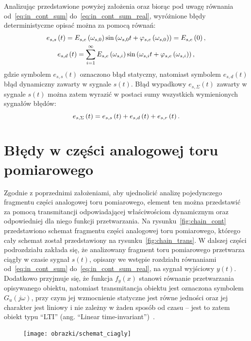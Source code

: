 Analizując przedstawione powyżej założenia oraz biorąc pod uwagę równania od~\eqref{eq:in_cont_sum} do~\eqref{eq:in_cont_sum_real}, wyróżnione błędy deterministyczne opisać można za pomocą równań:
\begin{gather}
e_{s,s} \left(t\right) = E_{s,e} \left(\omega_{s,0}\right) \sin \left( \omega_{s,0} t + \varphi_{s,e} \left(\omega_{s,0}\right) \right) = E_{s,e} \left(0\right) \label{eq:in_cont_err_stat}, \\
e_{s,d} \left(t\right) = \sum _{i = 1} ^{\infty} E_{s,e} \left(\omega_{s,i}\right) \sin \left( \omega_{s,i} t + \varphi_{s,e} \left(\omega_{s,i}\right) \right) \label{eq:in_cont_err_dyn},
\end{gather}
gdzie symbolem $e_{s,s}(t)$ oznaczono błąd statyczny, natomiast symbolem $e_{s,d}(t)$ błąd dynamiczny zawarty w sygnale $s(t)$. Błąd wypadkowy $e_{s,\Sigma}(t)$ zawarty w sygnale $s(t)$ można zatem wyrazić w postaci sumy wszystkich wymienionych sygnałów błędów:
\begin{equation}
e_{s,\Sigma} \left(t\right) = e_{s,s} \left(t\right) + e_{s,d} \left(t\right) + e_{s,r} \left(t\right) \label{eq:in_cont_err_sum}.
\end{equation}

\section{Błędy w części analogowej toru pomiarowego}

Zgodnie z poprzednimi założeniami, aby ujednolicić analizę pojedynczego fragmentu części analogowej toru pomiarowego, element ten można przedstawić za pomocą transmitancji odpowiadającej właściwościom dynamicznym oraz odpowiedniej dla niego funkcji przetwarzania. Na rysunku~\ref{fig:chain_cont} przedstawiono schemat fragmentu części analogowej toru pomiarowego, którego cały schemat został przedstawiony na rysunku~\ref{fig:chain_trans}. W dalszej części podrozdziału zakłada się, że analizowany fragment toru pomiarowego przetwarza ciągły w czasie sygnał $s(t)$, opisany we wstępie rozdziału równaniami od~\eqref{eq:in_cont_sum} do~\eqref{eq:in_cont_sum_real}, na sygnał wyjściowy $y(t)$. Dodatkowo przyjmuje się, że funkcja $f_{y}(x)$ stanowi równanie przetwarzania opisywanego obiektu, natomiast transmitancja obiektu jest oznaczona symbolem $G_{u}(j\omega)$, przy czym jej wzmocnienie statyczne jest równe jedności oraz jej charakter jest liniowy i nie zależny w żaden sposób od czasu -- jest to zatem obiekt typu \enquote{LTI} (ang. \enquote{Linear time-invariant})~\cite{oppenheim_sns}.

\begin{figure}[htb!]
\begin{center}
\texttt{[image: obrazki/schemat\_ciagly]}
\end{center}
\end{figure}

